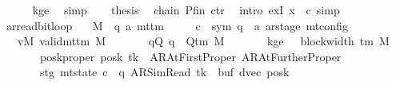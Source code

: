 \begin{isabellebody}
\ \ \ \ \isamarkupfalse%
\ kge{}\ \isamarkupfalse%
\ simp\isanewline
\ \ \isamarkupfalse%
\ {\isacharquery}{\kern0pt}thesis\ \isamarkupfalse%
\ chain\ Pfin\ ctr\ \isamarkupfalse%
\ {\isacharparenleft}{\kern0pt}intro\ exI{\isacharbrackleft}{\kern0pt}\ x\ {\isacharequal}{\kern0pt}\ c{\isacharprime}{\kern0pt}{\isacharprime}{\kern0pt}{\isacharbrackright}{\kern0pt}{\isacharparenright}{\kern0pt}\ simp\isanewline
{}\isamarkupfalse%
%
\endisatagproof
{\isafoldproof}%
%
\isadelimproof
\isanewline
%
\endisadelimproof
\isanewline
{}\isamarkupfalse%
\ ar{\isacharunderscore}{\kern0pt}read{\isacharunderscore}{\kern0pt}bit{\isacharunderscore}{\kern0pt}loop{\isacharcolon}{\kern0pt}\isanewline
\ \ \ M\ {\isacharcolon}{\kern0pt}{\isacharcolon}{\kern0pt}\ {\isachardoublequoteopen}{\isacharparenleft}{\kern0pt}{\isacharprime}{\kern0pt}q{\isacharcomma}{\kern0pt}\ {\isacharprime}{\kern0pt}a{\isacharparenright}{\kern0pt}\ mttm{\isachardoublequoteclose}\isanewline
\ \ \ \ \ c{\isacharprime}{\kern0pt}\ {\isacharcolon}{\kern0pt}{\isacharcolon}{\kern0pt}\ {\isachardoublequoteopen}{\isacharparenleft}{\kern0pt}sym{}{\isacharcomma}{\kern0pt}\ {\isacharprime}{\kern0pt}q\ {\isasymtimes}\ {\isacharprime}{\kern0pt}a\ ar{\isacharunderscore}{\kern0pt}stage{\isacharparenright}{\kern0pt}\ mt{\isacharunderscore}{\kern0pt}config{\isachardoublequoteclose}\isanewline
\ \ \ vM{\isacharcolon}{\kern0pt}\ {\isachardoublequoteopen}valid{\isacharunderscore}{\kern0pt}mttm\ M{\isachardoublequoteclose}\isanewline
\ \ \ \ \ \ \ qQ{\isacharcolon}{\kern0pt}\ {\isachardoublequoteopen}q\ {\isasymin}\ Q{\isacharunderscore}{\kern0pt}tm\ M{\isachardoublequoteclose}\isanewline
\ \ \ \ \ \ \ kge{}{\isacharcolon}{\kern0pt}\ {\isachardoublequoteopen}{}\ {\isasymle}\ block{\isacharunderscore}{\kern0pt}width\ {\isacharparenleft}{\kern0pt}{\isasymGamma}{\isacharunderscore}{\kern0pt}tm\ M{\isacharparenright}{\kern0pt}{\isachardoublequoteclose}\isanewline
\ \ \ \ \ \ \ posk{\isacharunderscore}{\kern0pt}proper{\isacharcolon}{\kern0pt}\ {\isachardoublequoteopen}posk\ tk\ {\isasymin}\ {\isacharbraceleft}{\kern0pt}AR{\isacharunderscore}{\kern0pt}AtFirstProper{\isacharcomma}{\kern0pt}\ AR{\isacharunderscore}{\kern0pt}AtFurtherProper{\isacharbraceright}{\kern0pt}{\isachardoublequoteclose}\isanewline
\ \ \ \ \ \ \ stg{\isacharcolon}{\kern0pt}\ {\isachardoublequoteopen}mt{\isacharunderscore}{\kern0pt}state\ c{\isacharprime}{\kern0pt}\ {\isacharequal}{\kern0pt}\ {\isacharparenleft}{\kern0pt}q{\isacharcomma}{\kern0pt}\ AR{\isacharunderscore}{\kern0pt}SimRead{\isacharcomma}{\kern0pt}\ tk{\isacharcomma}{\kern0pt}\ {}{\isacharcomma}{\kern0pt}\ buf{}{\isacharcomma}{\kern0pt}\ dvec{\isacharcomma}{\kern0pt}\ posk{\isacharparenright}{\kern0pt}{\isachardoublequoteclose}\isanewline

\end{isabellebody}
